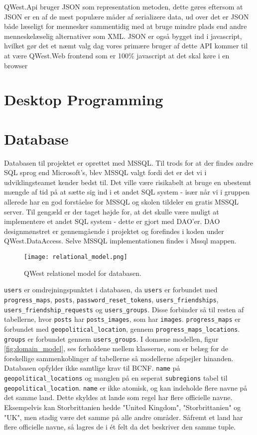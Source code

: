 QWest.Api bruger JSON som representation metoden, dette gøres eftersom at JSON er en af de mest populære måder af serializere data, ud over det er JSON både læseligt for mennesker sammentidig med at bruge mindre plads end andre menneskelæselig alternativer som XML. JSON er også bygget ind i javascript, hvilket gør det et næmt valg dag vores primære bruger af dette API kommer til at være QWest.Web frontend som er 100\% javascript at det skal køre i en browser

\section{Desktop Programming}\label{sec:deskProgramming}

\section{Database}\label{sec:database}
Databasen til projektet er oprettet med MSSQL\cite{MSSQL}. Til trods for at der findes andre SQL sprog end Microsoft's, blev MSSQL valgt fordi det er det vi i udviklingsteamet kender bedst til. Det ville være risikabelt at bruge en ubestemt mængde af tid på at sætte sig ind i et andet SQL system - især når vi i gruppen allerede har en god forståelse for MSSQL og skolen tildeler en gratis MSSQL server. Til gengæld er der taget højde for, at det skulle være muligt at implementere et andet SQL system - dette er gjort med DAO'er. DAO\cite{dao} designmønstret er gennemgående i projektet og forefindes i koden under QWest.DataAccess. Selve MSSQL implementationen findes i Mssql mappen. 

\begin{figure}
    \texttt{[image: relational\_model.png]}
    \caption{QWest relationel model for databasen.}
    \label{fig:relational_model}
\end{figure}

\texttt{users} er omdrejningspunktet i databasen, da \texttt{users} er forbundet med \texttt{progress\_maps}, \texttt{posts}, \texttt{password\_reset\_tokens}, \texttt{users\_friendships}, \texttt{users\_friendship\_requests} og \texttt{users\_groups}. Disse forbinder så til resten af tabellerne, hvor \texttt{posts} har \texttt{posts\_images}, som har \texttt{images}. \texttt{progress\_maps} er forbundet med \texttt{geopolitical\_location}, gennem \texttt{progress\_maps\_locations}. \texttt{groups} er forbundet gennem \texttt{users\_groups}. 
I domæne modellen, figur \ref{fig:domain_model}, ses forholdene mellem klasserne, som er belæg for de forskellige sammenkoblinger af tabellerne så modellerne afspejler hinanden. Databasen opfylder ikke samtlige krav til BCNF\cite{bcnf}. \texttt{name} på \texttt{geopolitical\_locations} og manglen på en seperat \texttt{subregions} tabel til \texttt{geopolitical\_location}. \texttt{name} er ikke atomisk, og kan indeholde flere navne på det samme land. Dette skyldes at lande som regel har flere officielle navne. Eksempelvis kan Storbrittanien hedde "United Kingdom", "Storbrittanien" og "UK", men stadig være det samme på alle andre områder. Såfremt et land har flere officielle navne, så lagres de i ét felt da det beskriver den samme tuple.

